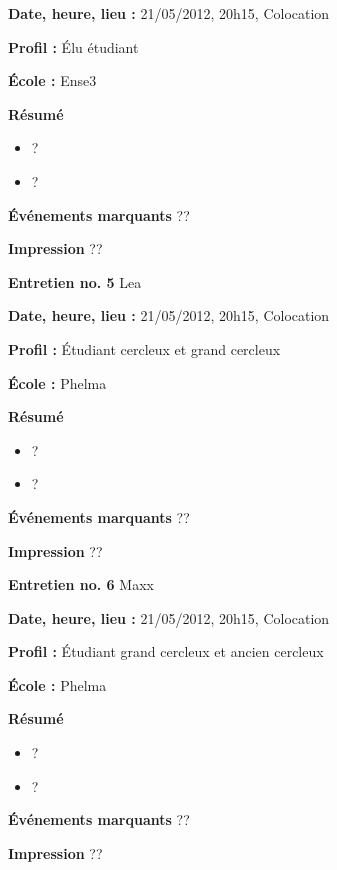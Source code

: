 \documentclass[a4paper, 11px]{article}
\begin{document}
\textbf{Date, heure, lieu : }
21/05/2012, 20h15, Colocation

\textbf{Profil : }
Élu étudiant

\textbf{École : }
Ense3

\textbf{Résumé}
	\begin{itemize}
		\item ?
		\item ?
	\end{itemize}

\textbf{Événements marquants}
??

\textbf{Impression}
??



\vspace{.3cm}

 \textbf {\large Entretien no. 5}
Lea

\textbf{Date, heure, lieu : }
21/05/2012, 20h15, Colocation

\textbf{Profil : }
Étudiant cercleux et grand cercleux


\textbf{École : }
Phelma

\textbf{Résumé}
	\begin{itemize}
		\item ?
		\item ?
	\end{itemize}

\textbf{Événements marquants}
??

\textbf{Impression}
??



\vspace{.3cm}

 \textbf {\large Entretien no. 6}
Maxx

\textbf{Date, heure, lieu : }
21/05/2012, 20h15, Colocation

\textbf{Profil : }
Étudiant grand cercleux et ancien cercleux


\textbf{École : }
Phelma

\textbf{Résumé}
	\begin{itemize}
		\item ?
		\item ?
	\end{itemize}

\textbf{Événements marquants}
??

\textbf{Impression}
??



\vspace{.3cm}
\end{document}

